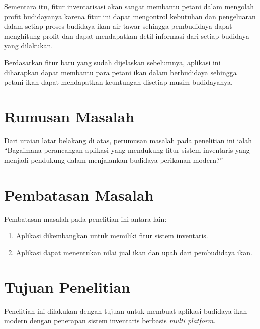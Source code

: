 Sementara itu, fitur inventarisasi akan sangat membantu petani dalam mengolah profit budidayanya karena fitur ini dapat mengontrol kebutuhan dan pengeluaran dalam setiap proses budidaya ikan air tawar sehingga pembudidaya dapat menghitung profit dan dapat mendapatkan detil informasi dari setiap budidaya yang dilakukan.

Berdasarkan fitur baru yang sudah dijelaskan sebelumnya, aplikasi ini diharapkan dapat membantu para petani ikan dalam berbudidaya sehingga petani ikan dapat mendapatkan keuntungan disetiap musim budidayanya.

\section{Rumusan Masalah}
Dari uraian latar belakang di atas, perumusan masalah pada penelitian ini ialah “Bagaimana perancangan aplikasi yang mendukung fitur sistem inventaris yang menjadi pendukung dalam menjalankan budidaya perikanan modern?”

\section{Pembatasan Masalah}
Pembatasan masalah pada penelitian ini antara lain:
\begin{enumerate}
	\item Aplikasi dikembangkan untuk memiliki fitur sistem inventaris.
	\item Aplikasi dapat menentukan nilai jual ikan dan upah dari pembudidaya ikan.
\end{enumerate}

\section{Tujuan Penelitian}
	Penelitian ini dilakukan dengan tujuan untuk membuat aplikasi budidaya ikan modern dengan penerapan sistem inventaris berbasis \emph{multi platform}.


